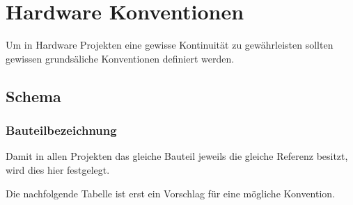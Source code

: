 



\section{Hardware Konventionen}
Um in Hardware Projekten eine gewisse Kontinuität zu gewährleisten sollten 
gewissen grundsäliche Konventionen definiert werden. 

\subsection{Schema}

\subsubsection{Bauteilbezeichnung}
Damit in allen Projekten das gleiche Bauteil jeweils die gleiche Referenz 
besitzt, wird dies hier festgelegt. 

Die nachfolgende Tabelle ist erst ein Vorschlag für eine mögliche Konvention. 

